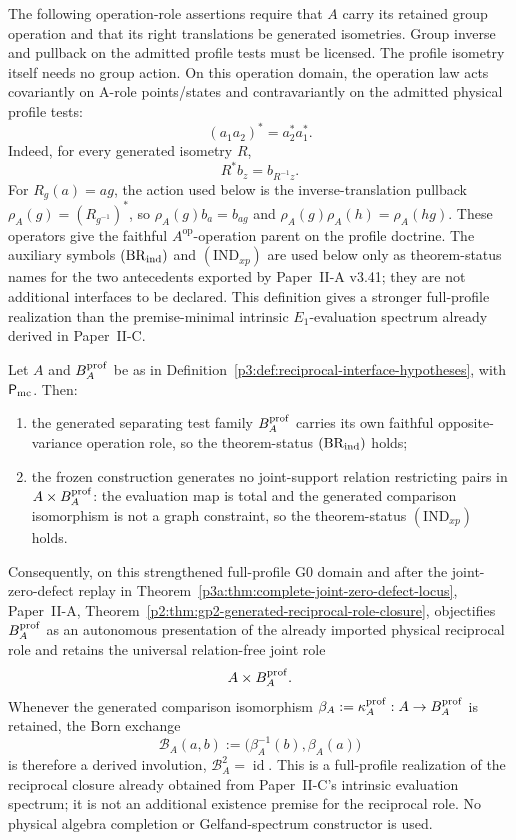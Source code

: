 \documentclass[11pt,a4paper]{article}
\begin{document}
\begin{definition}
The following operation-role assertions require that \(A\) carry its
retained group operation and that its right translations be generated
isometries. Group inverse and pullback on the admitted profile tests must be
licensed. The profile isometry itself needs no group action.
On this operation domain, the operation law acts covariantly on A-role points/states and
contravariantly on the admitted physical profile tests:
\[
 (a_1a_2)^*=a_2^*a_1^*.
\]
Indeed, for every generated isometry \(R\),
\[
       R^*b_z=b_{R^{-1}z}.
\]
For \(R_g(a)=ag\), the action used below is the inverse-translation
pullback \(\rho_A(g)=(R_{g^{-1}})^*\), so
\(\rho_A(g)b_a=b_{ag}\) and
\(\rho_A(g)\rho_A(h)=\rho_A(hg)\).
These operators give the faithful \(A^{\mathrm{op}}\)-operation parent
on the profile doctrine.  The auxiliary symbols \((\mathrm{BR}_{\rm ind})\) and
\((\mathrm{IND}_{xp})\) are used below only as theorem-status names for the
two antecedents exported by Paper~II-A v3.41; they are not additional
interfaces to be declared.  This definition gives a stronger full-profile
realization than the premise-minimal intrinsic \(E_1\)-evaluation spectrum
already derived in Paper~II-C.
\end{definition}

\begin{theorem}
\label{p3:thm:reciprocal-status-discharge}
Let \(A\) and \(B_A^{\rm prof}\) be as in
Definition~\ref{p3:def:reciprocal-interface-hypotheses}, with
\(\mathsf P_{\rm mc}\).  Then:
\begin{enumerate}[label=(\roman*),leftmargin=2.2em]
\item the generated separating test family \(B_A^{\rm prof}\) carries its own faithful
opposite-variance operation role, so the theorem-status
\((\mathrm{BR}_{\rm ind})\) holds;
\item the frozen construction generates no joint-support relation restricting
pairs in \(A\times B_A^{\rm prof}\): the evaluation map is total and the generated
comparison isomorphism is not a graph constraint, so the theorem-status
\((\mathrm{IND}_{xp})\) holds.
\end{enumerate}
Consequently, on this strengthened full-profile G0 domain and after the
joint-zero-defect replay in Theorem~\ref{p3a:thm:complete-joint-zero-defect-locus}, Paper~II-A,
Theorem~\ref{p2:thm:gp2-generated-reciprocal-role-closure}, objectifies
\(B_A^{\rm prof}\) as an autonomous presentation of the already imported
physical reciprocal role and retains the universal
relation-free joint role
\[
             A\times B_A^{\rm prof}.
\]
Whenever the generated comparison isomorphism
\(\beta_A:=\kappa_A^{\rm prof}:A\to B_A^{\rm prof}\) is
retained, the Born exchange
\[
 \mathcal B_A(a,b)
 :=\bigl(\beta_A^{-1}(b),\beta_A(a)\bigr)
\]
is therefore a derived involution,
\(\mathcal B_A^2=\operatorname{id}\).
This is a full-profile realization of the reciprocal closure already obtained
from Paper~II-C's intrinsic evaluation spectrum; it is not an additional
existence premise for the reciprocal role.  No physical algebra completion or
Gelfand-spectrum constructor is used.
\end{theorem}
\end{document}
